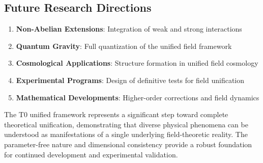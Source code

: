 \documentclass[12pt,a4paper]{article}
\begin{document}
	\subsection{Future Research Directions}
	\label{subsec:future_directions}
	
	\begin{enumerate}
		\item \textbf{Non-Abelian Extensions}: Integration of weak and strong interactions
		\item \textbf{Quantum Gravity}: Full quantization of the unified field framework
		\item \textbf{Cosmological Applications}: Structure formation in unified field cosmology
		\item \textbf{Experimental Programs}: Design of definitive tests for field unification
		\item \textbf{Mathematical Developments}: Higher-order corrections and field dynamics
	\end{enumerate}
	
	The T0 unified framework represents a significant step toward complete theoretical unification, demonstrating that diverse physical phenomena can be understood as manifestations of a single underlying field-theoretic reality. The parameter-free nature and dimensional consistency provide a robust foundation for continued development and experimental validation.
	
\end{document}
